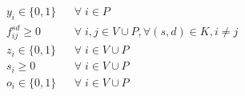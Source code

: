 			
			
			
			
			
			\begin{equation} \label{eq:vars}
			\begin{array}{rlclcl}	
			& y_i \in \{0, 1\} && \forall \; i \in P \\
			& f^{sd}_{ij} \ge 0 && \forall \; i , j \in V \cup P, \forall (s,d) \in K, i \neq j \\
			& z_i \in \{0, 1\} && \forall \; i \in V \cup P \\
			& s_i \ge 0 && \forall \; i \in V \cup P \\
			& o_i \in \{0, 1\} && \forall \; i \in V \cup P \\
			\end{array}
			\end{equation}
 

